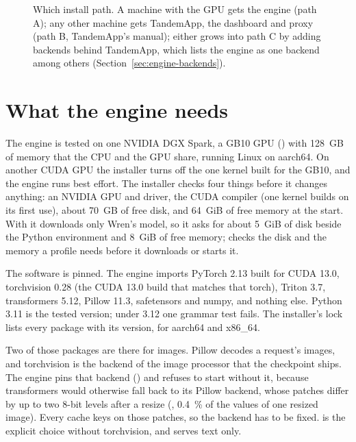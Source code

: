 \begin{figure}[htbp]
\centering

\caption[Which install path]{Which install path. A machine with the GPU gets the engine (path A); any other machine gets TandemApp, the dashboard and proxy (path B, TandemApp's manual); either grows into path C by adding backends behind TandemApp, which lists the engine as one backend among others (Section~\ref{sec:engine-backends}).}\label{fig:install-paths}
\end{figure}

\section{What the engine needs}

The engine is tested on one NVIDIA DGX Spark, a GB10 GPU () with 128~GB of memory that the CPU and the GPU share, running Linux on aarch64. On another CUDA GPU the installer turns off the one kernel built for the GB10, and the engine runs best effort. The installer checks four things before it changes anything: an NVIDIA GPU and driver, the CUDA compiler (one kernel builds on its first use), about 70~GB of free disk, and 64~GiB of free memory at the start. With  it downloads only Wren's model, so it asks for about 5~GiB of disk beside the Python environment and 8~GiB of free memory;  checks the disk and the memory a profile needs before it downloads or starts it.

The software is pinned. The engine imports PyTorch 2.13 built for CUDA 13.0, torchvision 0.28 (the CUDA 13.0 build that matches that torch), Triton 3.7, transformers 5.12, Pillow 11.3, safetensors and numpy, and nothing else. Python 3.11 is the tested version; under 3.12 one grammar test fails. The installer's lock lists every package with its version, for aarch64 and x86\_64.

Two of those packages are there for images. Pillow decodes a request's images, and torchvision is the backend of the image processor that the checkpoint ships. The engine pins that backend () and refuses to start without it, because transformers would otherwise fall back to its Pillow backend, whose patches differ by up to two 8-bit levels after a resize (\measured, 0.4~\% of the values of one resized image). Every cache keys on those patches, so the backend has to be fixed.  is the explicit choice without torchvision, and  serves text only.

